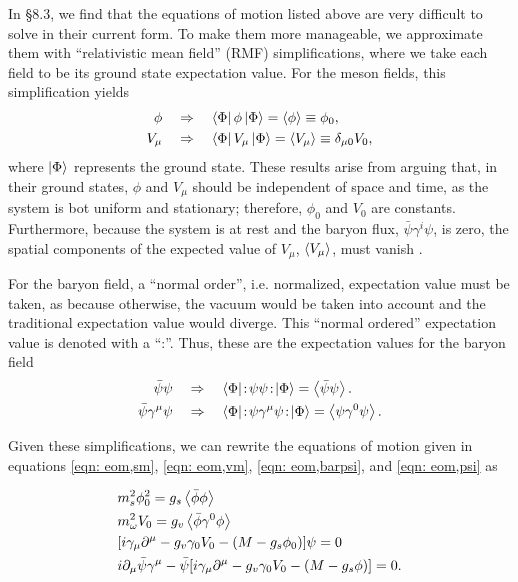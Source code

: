 In \autocite{diener_2008} \S 8.3, we find that the equations of motion listed above are very difficult to solve in their current form. To make them more manageable, we approximate them with ``relativistic mean field'' (RMF) simplifications, where we take each field to be its ground state expectation value. For the meson fields, this simplification yields
\begin{align}
    \phi &\quad\Rightarrow\quad \bra{\Phi} \phi \ket{\Phi} = \expval{\phi} \equiv \phi_0, \\
    V_\mu & \quad\Rightarrow\quad \bra{\Phi} V_\mu \ket{\Phi} = \expval{V_\mu} \equiv \delta_{\mu 0} V_0,
\end{align}
where $\ket{\Phi}$ represents the ground state. These results arise from arguing that, in their ground states, $\phi$ and $V_\mu$ should be independent of space and time, as the system is bot uniform and stationary; therefore, $\phi_0$ and $V_0$ are constants. Furthermore, because the system is at rest and the baryon flux, $\bar\psi\gamma^i\psi$, is zero, the spatial components of the expected value of $V_\mu$, $\expval{V_\mu}$, must vanish \autocite{diener_2008}.

For the baryon field, a ``normal order'', i.e. normalized, expectation value must be taken, as because otherwise, the vacuum would be taken into account and the traditional expectation value would diverge. This ``normal ordered'' expectation value is denoted with a ``:''. Thus, these are the expectation values for the baryon field
\begin{align}
    \bar\psi\psi &\goesto \bra{\Phi}\!:\!\psi\psi\!:\!\ket{\Phi} = \expval{\bar\psi\psi}.\\
    \bar\psi\gamma^\mu \psi &\goesto \bra{\Phi}\!:\!\psi\gamma^\mu\psi\!:\!\ket{\Phi} = \expval{\psi\gamma^0\psi}.
\end{align}

Given these simplifications, we can rewrite the equations of motion given in equations \eqref{eqn: eom,sm}, \eqref{eqn: eom,vm}, \eqref{eqn: eom,barpsi}, and \eqref{eqn: eom,psi} as

\begin{align}
    & m_s^2 \phi_0^2 = g_s\expval{\bar\phi\phi}\\
    & m_\omega^2 V_0 = g_v\expval{\bar\phi\gamma^0\phi}\\
    & \bqty{i\gamma_\mu\p^\mu - g_v\gamma_0 V_0 - (M - g_s\phi_0)}\psi = 0\\
    & i \p_\mu \bar\psi \gamma^\mu -\bar\psi\bqty{i\gamma_\mu\p^\mu - g_v \gamma_0V_0 - (M-g_s\phi)} = 0.
\end{align}

